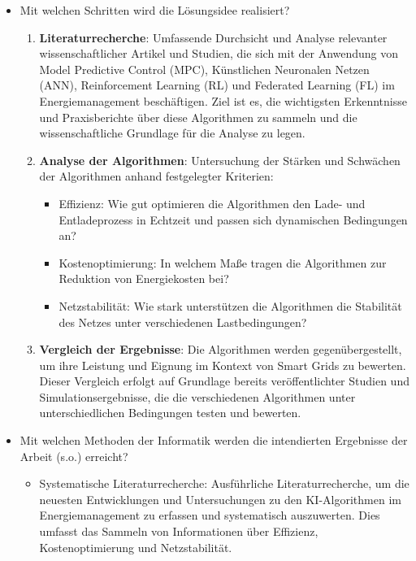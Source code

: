 \documentclass[12pt]{article} %
\begin{document}
\begin{itemize}

\item Mit welchen Schritten wird die Lösungsidee realisiert?

    \begin{enumerate}
        \item \textbf{Literaturrecherche}: Umfassende Durchsicht und Analyse relevanter wissenschaftlicher Artikel und Studien, die sich mit der Anwendung von Model Predictive Control (MPC), Künstlichen Neuronalen Netzen (ANN), Reinforcement Learning (RL) und Federated Learning (FL) im Energiemanagement beschäftigen. Ziel ist es, die wichtigsten Erkenntnisse und Praxisberichte über diese Algorithmen zu sammeln und die wissenschaftliche Grundlage für die Analyse zu legen.

        \item \textbf{Analyse der Algorithmen}: Untersuchung der Stärken und Schwächen der Algorithmen anhand festgelegter Kriterien:
            \begin{itemize}
                \item Effizienz: Wie gut optimieren die Algorithmen den Lade- und Entladeprozess in Echtzeit und passen sich dynamischen Bedingungen an?
                \item Kostenoptimierung: In welchem Maße tragen die Algorithmen zur Reduktion von Energiekosten bei?
                \item Netzstabilität: Wie stark unterstützen die Algorithmen die Stabilität des Netzes unter verschiedenen Lastbedingungen?
            \end{itemize}
        
        \item \textbf{Vergleich der Ergebnisse}: Die Algorithmen werden gegenübergestellt, um ihre Leistung und Eignung im Kontext von Smart Grids zu bewerten. Dieser Vergleich erfolgt auf Grundlage bereits veröffentlichter Studien und Simulationsergebnisse, die die verschiedenen Algorithmen unter unterschiedlichen Bedingungen testen und bewerten.
    \end{enumerate}

\item Mit welchen Methoden der Informatik werden die intendierten Ergebnisse der Arbeit (s.o.) erreicht?

    \begin{itemize}
        \item Systematische Literaturrecherche: Ausführliche Literaturrecherche, um die neuesten Entwicklungen und Untersuchungen zu den KI-Algorithmen im Energiemanagement zu erfassen und systematisch auszuwerten. Dies umfasst das Sammeln von Informationen über Effizienz, Kostenoptimierung und Netzstabilität.
        

\end{itemize}
\end{itemize}
\end{document}
